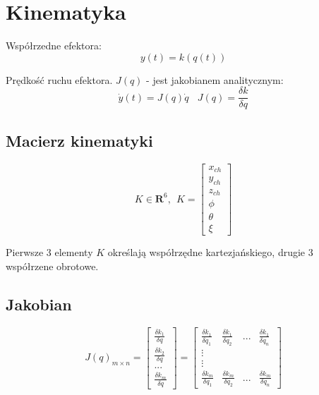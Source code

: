 \documentclass{article}
\begin{document}
\section{Kinematyka}

Współrzedne efektora:
$$
    y(t) = k( q(t) )
$$

Prędkość ruchu efektora. $J(q)$ - jest jakobianem analitycznym:
$$
    \dot{y}(t) = J(q) \dot{q}
    \ \ \ \
    J(q) = \frac{\delta k}{\delta q}
$$

\subsection{Macierz kinematyki}
\Large
$$
    K \in \textbf{R}^6, \ \
    K = \begin{bmatrix}
        x_{ch} \\
        y_{ch} \\
        z_{ch} \\
        \phi   \\
        \theta \\
        \xi
    \end{bmatrix}
$$
\normalsize

Pierwsze 3 elementy $K$ określają współrzędne kartezjańskiego, drugie 3 współrzene obrotowe.

\subsection{Jakobian}
\Large
$$
    J(q)_{m\times n} = \begin{bmatrix}
        \frac{\delta k_1}{\delta q} \\
        \frac{\delta k_2}{\delta q} \\
        ...                         \\
        \frac{\delta k_m}{\delta q}
    \end{bmatrix}
    = \begin{bmatrix}
        \frac{\delta k_1}{\delta q_1} &
        \frac{\delta k_1}{\delta q_2} &
        ...                           &
        \frac{\delta k_1}{\delta q_n}   \\
        \vdots                          \\
        \vdots                          \\
        \frac{\delta k_m}{\delta q_1} &
        \frac{\delta k_m}{\delta q_2} &
        ...                           &
        \frac{\delta k_m}{\delta q_n}
    \end{bmatrix}
$$
\normalsize
\end{document}
